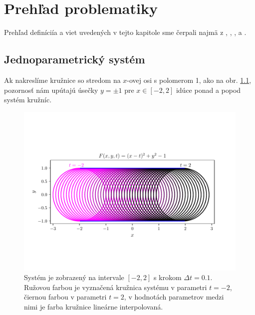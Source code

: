 \chapter{Prehľad problematiky}
\label{kap:kapitola1}
Prehľad definíciía a viet uvedených v tejto kapitole sme čerpali najmä z \cite{Bru92}, \cite{Bru81}, \cite{doCarmo17}, \cite{Ode20} a \cite{Vra22}.

\section{Jednoparametrický systém}
Ak nakreslíme kružnice so stredom na $x$-ovej osi s polomerom 1, ako na obr. \ref{fig:new_system}, pozornosť nám upútajú úsečky $y = \pm 1$ pre $ x \in [-2,2]$ idúce ponad a popod systém kružníc.


\begin{figure}[h]
	\centering
	\includegraphics[trim={0.5cm 2.5cm 0.5cm 3cm},clip]{images/new_envelope.pdf}
	\caption[Jednoparametrický systém kružníc.]{Systém je zobrazený na intervale $[-2,2]$ s krokom  $\Delta t = 0.1$. Ružovou farbou je vyznačená kružnica systému v parametri $t=-2$, čiernou farbou v parametri $t = 2$, v hodnotách parametrov medzi nimi je farba kružnice lineárne interpolovaná. }
	\label{fig:new_system}
\end{figure}

